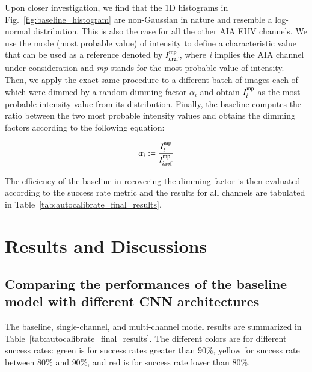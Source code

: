 \documentclass{aa}
\begin{document}
Upon closer investigation, we find that the $1$D histograms in Fig.~\ref{fig:baseline_histogram} are non-Gaussian in nature and resemble a log-normal distribution. This is also the case for all the other AIA EUV channels. We use the mode (most probable value) of intensity to define a characteristic value that can be used as a reference denoted by $I_{i,{\rm ref}}^{\rm mp}$, where \textit{i} implies the AIA channel under consideration and \textit{mp} stands for the most probable value of intensity. Then, we apply the exact same procedure to a different batch of images each of which were dimmed by a random dimming factor $\alpha_i$ and obtain $I^{\rm mp}_{i}$ as the most probable intensity value from its distribution. Finally, the baseline computes the ratio between the two most probable intensity values and obtains the dimming factors according to the following equation:

\begin{equation}
    \alpha_i := \frac{I^{\rm mp}_{i}}{I_{i, {\rm ref}}^{\rm mp}}
\end{equation}

The efficiency of the baseline in recovering the dimming factor is then evaluated according to the success rate metric and the results for all channels are tabulated in Table~\ref{tab:autocalibrate_final_results}. 

\section{Results and Discussions}
 \label{Section:Results}

\subsection{Comparing the performances of the baseline model with different CNN architectures}
The baseline, single-channel, and multi-channel model results are summarized in Table~\ref{tab:autocalibrate_final_results}. The different colors are for different success rates: green is for success rates greater than $90\%$, yellow for success rate between $80\%$ and $90\%$, and red is for success rate lower than $80\%$.
\end{document}
